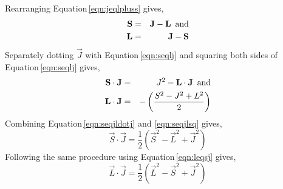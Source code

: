 Rearranging Equation\,\ref{eqn:jeqlpluss} gives,
\begin{eqnarray}
\label{eqn:seqlj} \vec{S} &=& \vec{J}-\vec{L} \mbox{\, and} \\
\label{eqn:leqsj} \vec{L} &=& \vec{J}-\vec{S}
\end{eqnarray}
Separately dotting $\vec{J}$ with Equation\,\ref{eqn:seqlj} and squaring both sides of Equation\,\ref{eqn:seqlj} gives,
\begin{eqnarray}
\label{eqn:seqjldotj} \vec{S}\cdot\vec{J} &=& J^2-\vec{L}\cdot\vec{J} \mbox{\, and} \\
\label{eqn:seqjlsq} \vec{L}\cdot\vec{J} &=& -\left(\frac{S^2-J^2+L^2}{2}\right)
\end{eqnarray}
Combining Equation\,\ref{eqn:seqjldotj} and \ref{eqn:seqjlsq} gives,
\begin{equation}
\label{eqn:sdotj} \vec{S} \cdot \vec{J} = \frac{1}{2}(\vec{S}^2-\vec{L}^2+\vec{J}^2)
\end{equation}
Following the same procedure using Equation\,\ref{eqn:leqsj} gives,
\begin{equation}
\label{eqn:ldotj} \vec{L} \cdot \vec{J} = \frac{1}{2}(\vec{L}^2-\vec{S}^2+\vec{J}^2)
\end{equation}

